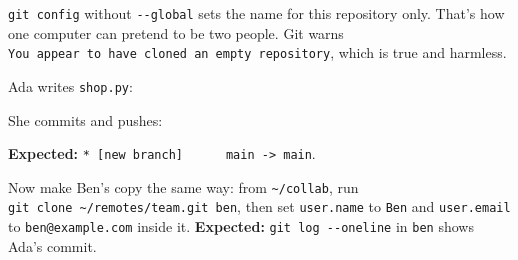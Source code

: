 \texttt{git\ config} without \texttt{-\/-global} sets the name for this repository only. That's how one computer can pretend to be two people. Git warns \texttt{You\ appear\ to\ have\ cloned\ an\ empty\ repository}, which is true and harmless.


Ada writes \texttt{shop.py}:

\begin{codeblock}

\begin{Shaded}
\begin{Highlighting}[]
\OperatorTok{=}\NormalTok{ \{}\NormalTok{: }\NormalTok{, }\NormalTok{: }\NormalTok{\}}


     


\NormalTok{(total([}\NormalTok{, }\NormalTok{]))}
\end{Highlighting}
\end{Shaded}

\end{codeblock}


She commits and pushes:

\begin{codeblock}

\begin{Shaded}
\begin{Highlighting}[]
 
\end{Highlighting}
\end{Shaded}

\end{codeblock}

\textbf{Expected:} \texttt{*\ {[}new\ branch{]}\ \ \ \ \ \ main\ -}\allowbreak{}\texttt{\textgreater{}\ main}.

Now make Ben's copy the same way: from \texttt{\textasciitilde{}/collab}, run \texttt{git\ clone\ \textasciitilde{}/}\allowbreak{}\texttt{remotes/}\allowbreak{}\texttt{team.}\allowbreak{}\texttt{git\ ben}, then set \texttt{user.name} to \texttt{Ben} and \texttt{user.email} to \texttt{ben@example.com} inside it. \textbf{Expected:} \texttt{git\ log\ -\/-oneline} in \texttt{ben} shows Ada's commit.

